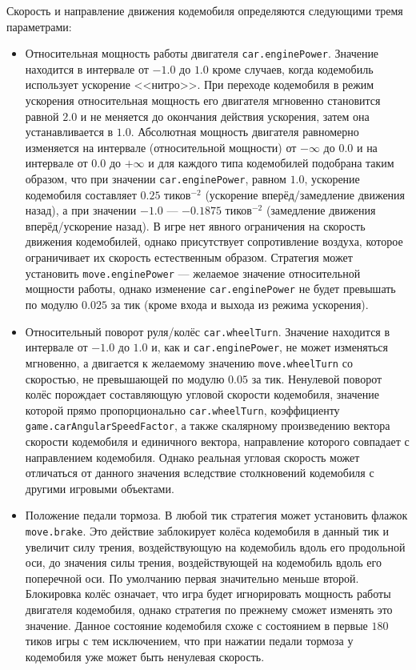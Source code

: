 Скорость и направление движения кодемобиля определяются следующими тремя параметрами:
\begin{itemize}
  \item Относительная мощность работы двигателя \texttt{car.enginePower}. Значение находится в интервале от $-1.0$ до $1.0$ кроме случаев,
        когда кодемобиль использует ускорение <<нитро>>. При переходе кодемобиля в режим ускорения относительная мощность его двигателя
        мгновенно становится равной $2.0$ и не меняется до окончания действия ускорения, затем она устанавливается в $1.0$. Абсолютная
        мощность двигателя равномерно изменяется на интервале (относительной мощности) от $-\infty$ до $0.0$ и на интервале от $0.0$ до
        $+\infty$ и для каждого типа кодемобилей подобрана таким образом, что при значении \texttt{car.enginePower}, равном $1.0$, ускорение
        кодемобиля составляет $0.25$ тиков$^{-2}$ (ускорение вперёд/замедление движения назад), а при значении $-1.0$ --- $-0.1875$
        тиков$^{-2}$ (замедление движения вперёд/ускорение назад). В игре нет явного ограничения на скорость движения кодемобилей, однако
        присутствует сопротивление воздуха, которое ограничивает их скорость естественным образом. Стратегия может установить
        \texttt{move.enginePower} --- желаемое значение относительной мощности работы, однако изменение \texttt{car.enginePower} не будет
        превышать по модулю $0.025$ за тик (кроме входа и выхода из режима ускорения).
  \item Относительный поворот руля/колёс \texttt{car.wheelTurn}. Значение находится в интервале от $-1.0$ до $1.0$ и, как и
        \texttt{car.enginePower}, не может изменяться мгновенно, а двигается к желаемому значению \texttt{move.wheelTurn} со скоростью, не
        превышающей по модулю $0.05$ за тик. Ненулевой поворот колёс порождает составляющую угловой скорости кодемобиля, значение которой
        прямо пропорционально \texttt{car.wheelTurn}, коэффициенту \texttt{game.carAngularSpeedFactor}, а также скалярному произведению
        вектора скорости кодемобиля и единичного вектора, направление которого совпадает с направлением кодемобиля. Однако реальная угловая
        скорость может отличаться от данного значения вследствие столкновений кодемобиля с другими игровыми объектами.
  \item Положение педали тормоза. В любой тик стратегия может установить флажок \texttt{move.brake}. Это действие заблокирует колёса
        кодемобиля в данный тик и увеличит силу трения, воздействующую на кодемобиль вдоль его продольной оси, до значения силы трения,
        воздействующей на кодемобиль вдоль его поперечной оси. По умолчанию первая значительно меньше второй. Блокировка колёс означает, что
        игра будет игнорировать мощность работы двигателя кодемобиля, однако стратегия по прежнему сможет изменять это значение. Данное
        состояние кодемобиля схоже с состоянием в первые $180$ тиков игры с тем исключением, что при нажатии педали тормоза у кодемобиля уже
        может быть ненулевая скорость.
\end{itemize}

